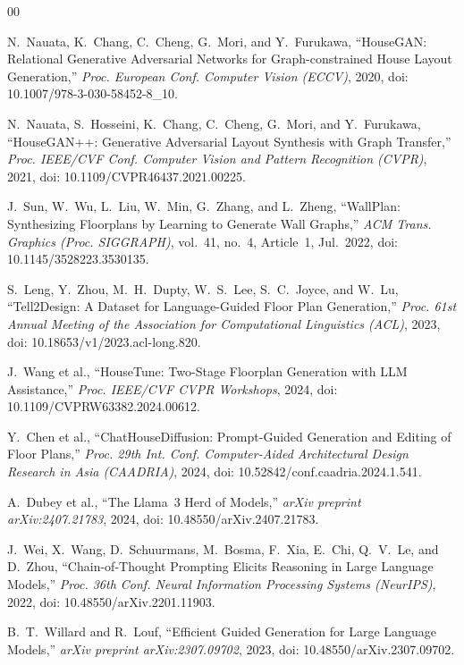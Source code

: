 \documentclass[10pt, twocolumn, letterpaper]{article}
\begin{document}
\begin{thebibliography}{00}

N.~Nauata, K.~Chang, C.~Cheng, G.~Mori, and Y.~Furukawa,
``HouseGAN: Relational Generative Adversarial Networks for Graph-constrained
House Layout Generation,''
\textit{Proc. European Conf. Computer Vision (ECCV)}, 2020,
doi: 10.1007/978-3-030-58452-8\_10.

N.~Nauata, S.~Hosseini, K.~Chang, C.~Cheng, G.~Mori, and Y.~Furukawa,
``HouseGAN++: Generative Adversarial Layout Synthesis with Graph Transfer,''
\textit{Proc. IEEE/CVF Conf. Computer Vision and Pattern Recognition (CVPR)},
2021, doi: 10.1109/CVPR46437.2021.00225.

J.~Sun, W.~Wu, L.~Liu, W.~Min, G.~Zhang, and L.~Zheng,
``WallPlan: Synthesizing Floorplans by Learning to Generate Wall Graphs,''
\textit{ACM Trans. Graphics (Proc. SIGGRAPH)}, vol.~41, no.~4, Article~1,
Jul.~2022, doi: 10.1145/3528223.3530135.

S.~Leng, Y.~Zhou, M.~H.~Dupty, W.~S.~Lee, S.~C.~Joyce, and W.~Lu,
``Tell2Design: A Dataset for Language-Guided Floor Plan Generation,''
\textit{Proc. 61st Annual Meeting of the Association for Computational
Linguistics (ACL)}, 2023,
doi: 10.18653/v1/2023.acl-long.820.

J.~Wang et al.,
``HouseTune: Two-Stage Floorplan Generation with LLM Assistance,''
\textit{Proc. IEEE/CVF CVPR Workshops}, 2024,
doi: 10.1109/CVPRW63382.2024.00612.

Y.~Chen et al.,
``ChatHouseDiffusion: Prompt-Guided Generation and Editing of Floor Plans,''
\textit{Proc. 29th Int. Conf. Computer-Aided Architectural Design Research
in Asia (CAADRIA)}, 2024,
doi: 10.52842/conf.caadria.2024.1.541.

A.~Dubey et al.,
``The Llama~3 Herd of Models,''
\textit{arXiv preprint arXiv:2407.21783}, 2024,
doi: 10.48550/arXiv.2407.21783.

J.~Wei, X.~Wang, D.~Schuurmans, M.~Bosma, F.~Xia, E.~Chi, Q.~V.~Le,
and D.~Zhou,
``Chain-of-Thought Prompting Elicits Reasoning in Large Language Models,''
\textit{Proc. 36th Conf. Neural Information Processing Systems (NeurIPS)},
2022, doi: 10.48550/arXiv.2201.11903.

B.~T.~Willard and R.~Louf,
``Efficient Guided Generation for Large Language Models,''
\textit{arXiv preprint arXiv:2307.09702}, 2023,
doi: 10.48550/arXiv.2307.09702.


\end{thebibliography}
\end{document}
